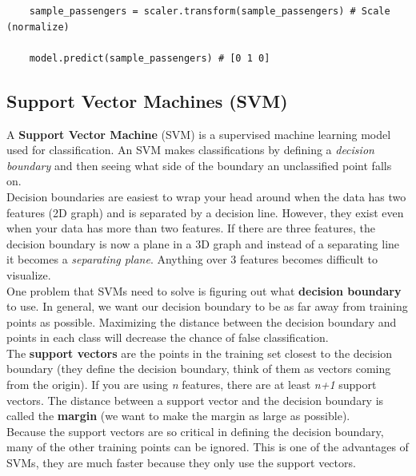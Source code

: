 \documentclass[11pt, a4paper]{article}
\begin{document}
\begin{spacing}{1.1}
\begin{lstlisting}
	sample_passengers = scaler.transform(sample_passengers) # Scale (normalize)
	
	model.predict(sample_passengers) # [0 1 0] 
	\end{lstlisting} \newpage

	\subsection{Support Vector Machines (SVM)}
	A \textbf{Support Vector Machine} (SVM) is a supervised machine learning model used for classification. An SVM makes classifications by defining a \textit{decision boundary} and then seeing what side of the boundary an unclassified point falls on. \vspace*{1mm} \\
	Decision boundaries are easiest to wrap your head around when the data has two features (2D graph) and is separated by a decision line. However, they exist even when your data has more than two features. If there are three features, the decision boundary is now a plane in a 3D graph and instead of a separating line it becomes a \textit{separating plane}. Anything over 3 features becomes difficult to visualize. \vspace*{2mm} \\
	One problem that SVMs need to solve is figuring out what \textbf{decision boundary} to use. In general, we want our decision boundary to be as far away from training points as possible. Maximizing the distance between the decision boundary and points in each class will decrease the chance of false classification. \vspace*{2mm} \\
	The \textbf{support vectors} are the points in the training set closest to the decision boundary (they define the decision boundary, think of them as vectors coming from the origin). If you are using \textit{n} features, there are at least \textit{n+1} support vectors. The distance between a support vector and the decision boundary is called the \textbf{margin} (we want to make the margin as large as possible). \vspace*{1mm} \\
	Because the support vectors are so critical in defining the decision boundary, many of the other training points can be ignored. This is one of the advantages of SVMs, they are much faster because they only use the support vectors. \vspace*{2mm} \\

\end{spacing}
\end{document}
